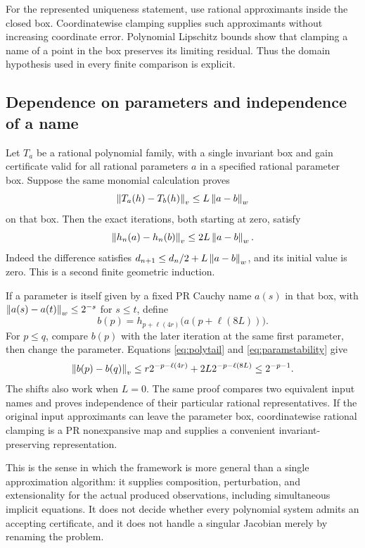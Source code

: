 For the represented uniqueness statement, use rational approximants inside the closed box. Coordinatewise clamping supplies such approximants without increasing coordinate error. Polynomial Lipschitz bounds show that clamping a name of a point in the box preserves its limiting residual. Thus the domain hypothesis used in every finite comparison is explicit.

\subsection{Dependence on parameters and independence of a name}

Let \(T_a\) be a rational polynomial family, with a single invariant box and gain certificate valid for all rational parameters \(a\) in a specified rational parameter box. Suppose the same monomial calculation proves
\[
 \left\lVert T_a(h)-T_b(h)\right\rVert_v\le L\left\lVert a-b\right\rVert_w
\]
on that box. Then the exact iterations, both starting at zero, satisfy
\begin{equation}\label{eq:paramstability}
 \left\lVert h_n(a)-h_n(b)\right\rVert_v\le 2L\left\lVert a-b\right\rVert_w.
\end{equation}
Indeed the difference satisfies \(d_{n+1}\le d_n/2+L\left\lVert a-b\right\rVert_w\), and its initial value is zero. This is a second finite geometric induction.

If a parameter is itself given by a fixed PR Cauchy name \(a(s)\) in that box, with \(\left\lVert a(s)-a(t)\right\rVert_w\le2^{-s}\) for \(s\le t\), define
\[
 b(p)=h_{p+\ell(4r)}\bigl(a(p+\ell(8L))\bigr).
\]
For \(p\le q\), compare \(b(p)\) with the later iteration at the same first parameter, then change the parameter. Equations \eqref{eq:polytail} and \eqref{eq:paramstability} give
\[
 \left\lVert b(p)-b(q)\right\rVert_v
 \le r2^{-p-\ell(4r)}+2L2^{-p-\ell(8L)}
 \le 2^{-p-1}.
\]
The shifts also work when \(L=0\). The same proof compares two equivalent input names and proves independence of their particular rational representatives. If the original input approximants can leave the parameter box, coordinatewise rational clamping is a PR nonexpansive map and supplies a convenient invariant-preserving representation.

This is the sense in which the framework is more general than a single approximation algorithm: it supplies composition, perturbation, and extensionality for the actual produced observations, including simultaneous implicit equations. It does not decide whether every polynomial system admits an accepting certificate, and it does not handle a singular Jacobian merely by renaming the problem.

